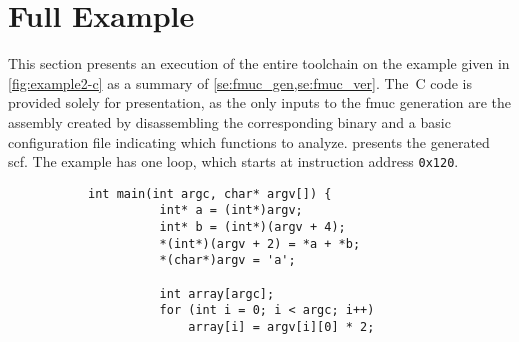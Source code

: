 \section{Full Example}\label{se:syntax_example}
This section presents an execution of the entire toolchain
on the example given in \cref{fig:example2-c}
as a summary of \cref{se:fmuc_gen,se:fmuc_ver}.
The~C code is provided solely for presentation,
as the only inputs to the \ac{fmuc} generation
are the assembly created by disassembling the corresponding binary%
%
%
and a basic configuration file indicating which functions to analyze.
 presents the generated \ac{scf}.
The example has one loop, which starts at instruction address \texttt{0x120}.%
\begin{figure}
  \begin{subfigure}[b]{.53\linewidth}
    \begin{lstlisting}[style=C, gobble=6]
      int main(int argc, char* argv[]) {
          int* a = (int*)argv;
          int* b = (int*)(argv + 4);
          *(int*)(argv + 2) = *a + *b;
          *(char*)argv = 'a';

          int array[argc];
          for (int i = 0; i < argc; i++)
              array[i] = argv[i][0] * 2;


\end{lstlisting}
\end{subfigure}
\end{figure}
